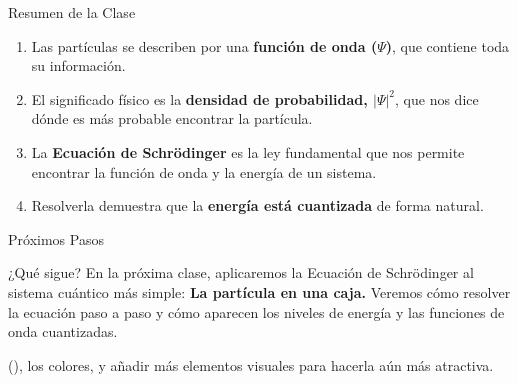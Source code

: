 	\begin{frame}{Resumen de la Clase}
		\begin{enumerate}
			\item Las partículas se describen por una \textbf{función de onda ($\Psi$)}, que contiene toda su información.
			\item El significado físico es la \textbf{densidad de probabilidad, $|\Psi|^2$}, que nos dice dónde es más probable encontrar la partícula.
			\item La \textbf{Ecuación de Schrödinger} es la ley fundamental que nos permite encontrar la función de onda y la energía de un sistema.
			\item Resolverla demuestra que la \textbf{energía está cuantizada} de forma natural.
		\end{enumerate}
	\end{frame}
	
	\begin{frame}{Próximos Pasos}
		\begin{block}{¿Qué sigue?}
			En la próxima clase, aplicaremos la Ecuación de Schrödinger al sistema cuántico más simple:
			\vspace{1em}
			\centering\textbf{\Large La partícula en una caja.}
			\vspace{1em}
			Veremos cómo resolver la ecuación paso a paso y cómo aparecen los niveles de energía y las funciones de onda cuantizadas.
		\end{block}
	\end{frame}
	


 (), los colores, y añadir más elementos visuales para hacerla aún más atractiva.